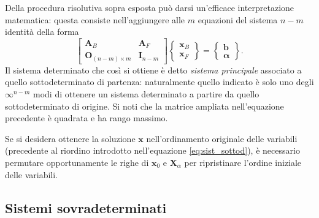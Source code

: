 \begin{oss}
	Della procedura risolutiva sopra esposta può darsi un'efficace interpretazione matematica: questa consiste nell'aggiungere alle $m$ equazioni del sistema $n-m$ identità della forma
	\begin{equation}\label{sist_ind4}
		\left[ \begin{array}{c|c}
			\bm{A}_B & \bm{A}_F \\
			\hline
			\bm{O}_{(n-m)\times m} & \bm{I}_{n-m}
		\end{array} \right]
		\left\{ \begin{array}{c}
			\bm{x}_{B} \\
			\hline
			\bm{x}_{F}
		\end{array} \right\}
		=
		\left\{ \begin{array}{c}
			\bm{b} \\
			\hline
			\bm{\alpha}
		\end{array} \right\}.
	\end{equation}
	Il sistema determinato che così si ottiene è detto \textit{sistema principale} associato a quello sottodeterminato di partenza: naturalmente quello indicato è solo uno degli $\infty^{n-m}$ modi di ottenere un sistema determinato a partire da quello sottodeterminato di origine. Si noti che la matrice ampliata nell'equazione precedente è quadrata e ha rango massimo.
\end{oss}

\begin{oss}\label{sol_in_base_outbase}
	Se si desidera ottenere la soluzione $\bm{x}$ nell'ordinamento originale delle variabili (precedente al riordino introdotto nell'equazione \eqref{eq:sist_sottod}), è necessario permutare opportunamente le righe di $\bm{x}_0$ e $\bm{X}_{\alpha}$ per ripristinare l'ordine iniziale delle variabili.
\end{oss}



\subsection{Sistemi sovradeterminati}\label{par:sovradeterminati}

